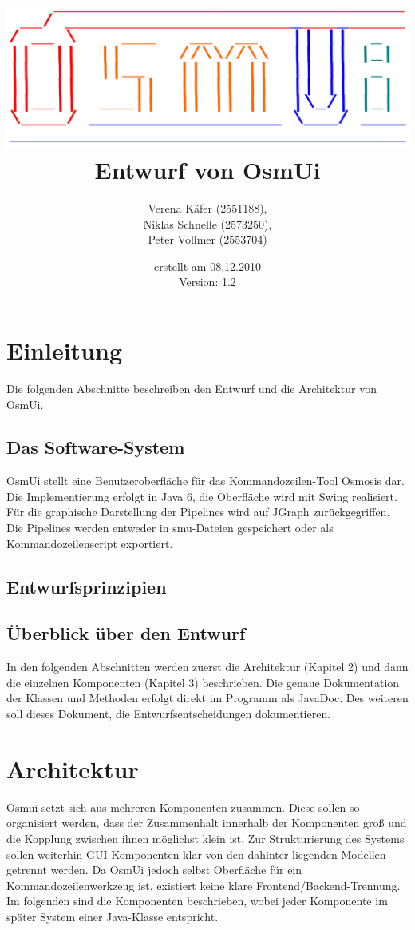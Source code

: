 \documentclass[a4paper,12pt]{scrartcl}
\author{
Verena Käfer (2551188),\\
Niklas Schnelle (2573250),\\
Peter Vollmer (2553704)}
\date{erstellt am 08.12.2010\\
Version: 1.2}
\title{\includegraphics[width=15cm]{../projektplan/Logo_Osmui.png} \\ 
Entwurf von OsmUi}
\begin{document}
\maketitle
\newpage
\tableofcontents
\newpage

\section{Einleitung}
Die folgenden Abschnitte beschreiben den Entwurf und die Architektur von OsmUi.
\subsection{Das Software-System}
OsmUi stellt eine Benutzeroberfläche für das Kommandozeilen-Tool Osmosis dar. Die Implementierung erfolgt in Java 6, die Oberfläche wird mit Swing realisiert. Für die graphische Darstellung der Pipelines wird auf JGraph zurückgegriffen. Die Pipelines werden entweder in smu-Dateien gespeichert oder als Kommandozeilenscript exportiert.
\subsection{Entwurfsprinzipien}

\subsection{Überblick über den Entwurf}
In den folgenden Abschnitten werden zuerst die Architektur (Kapitel 2) und dann die einzelnen Komponenten (Kapitel 3) beschrieben. Die genaue Dokumentation der Klassen und Methoden erfolgt direkt im Programm als JavaDoc. Des weiteren soll dieses Dokument, die Entwurfsentscheidungen dokumentieren.

\section{Architektur}
Osmui setzt sich aus mehreren Komponenten zusammen. Diese sollen so organisiert werden, dass der Zusammenhalt innerhalb der Komponenten groß und die Kopplung zwischen ihnen möglichst klein ist. Zur Strukturierung des Systems sollen weiterhin GUI-Komponenten klar von den dahinter liegenden Modellen getrennt werden. Da OsmUi jedoch selbst Oberfläche für ein Kommandozeilenwerkzeug ist, existiert keine klare Frontend/Backend-Trennung.\\
Im folgenden sind die Komponenten beschrieben, wobei jeder Komponente im später System einer Java-Klasse entspricht.
\end{document}
